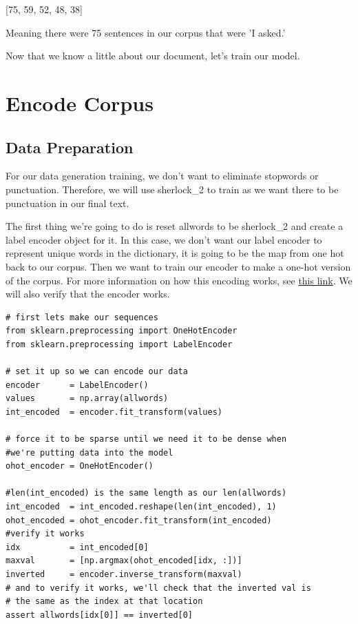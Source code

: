 \documentclass{article}
\begin{document}
[75, 59, 52, 48, 38]

Meaning there were 75 sentences in our corpus that were 'I asked.' 

Now that we know a little about our document, let's train our model.

 \section{Encode Corpus}
 
 \subsection{Data Preparation}
 For our data generation training, we don't want to eliminate stopwords or punctuation. Therefore, we will use sherlock\_2 to train as we want there to be punctuation in our final text. 
 
 The first thing we're going to do is reset allwords to be sherlock\_2 and create a label encoder object for it. In this case, we don't want our label encoder to represent unique words in the dictionary, it is going to be the map from one hot back to our corpus. Then we want to train our encoder to make a one-hot version of the corpus. For more information on how this encoding works, see \href{https://machinelearningmastery.com/how-to-one-hot-encode-sequence-data-in-python/}{this link}. We will also verify that the encoder works. 
 
 
 \begin{verbatim}
# first lets make our sequences
from sklearn.preprocessing import OneHotEncoder
from sklearn.preprocessing import LabelEncoder

# set it up so we can encode our data
encoder      = LabelEncoder()
values       = np.array(allwords)
int_encoded  = encoder.fit_transform(values)

# force it to be sparse until we need it to be dense when 
#we're putting data into the model
ohot_encoder = OneHotEncoder()

#len(int_encoded) is the same length as our len(allwords)
int_encoded  = int_encoded.reshape(len(int_encoded), 1) 
ohot_encoded = ohot_encoder.fit_transform(int_encoded)
#verify it works
idx          = int_encoded[0]
maxval       = [np.argmax(ohot_encoded[idx, :])]
inverted     = encoder.inverse_transform(maxval)
# and to verify it works, we'll check that the inverted val is
# the same as the index at that location
assert allwords[idx[0]] == inverted[0]
 \end{verbatim}
 
\end{document}
